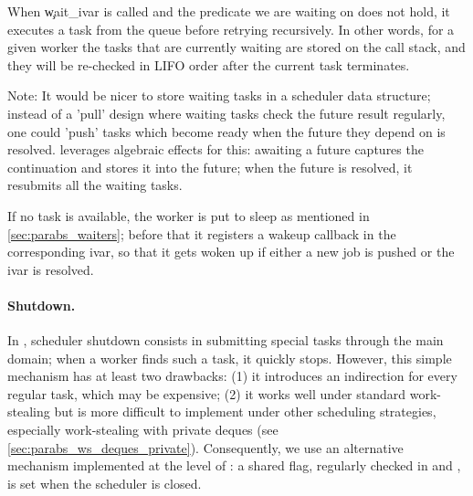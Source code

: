 When \c{wait\_ivar} is called and the predicate we are waiting on does not hold, it executes a task from the queue before retrying recursively. In other words, for a given worker the tasks that are currently waiting are stored on the call stack, and they will be re-checked in LIFO order after the current task terminates.

Note: It would be nicer to store waiting tasks in a scheduler data structure; instead of a 'pull' design where waiting tasks check the future result regularly, one could 'push' tasks which become ready when the future they depend on is resolved. \Domainslib leverages algebraic effects for this: awaiting a future captures the continuation and stores it into the future; when the future is resolved, it resubmits all the waiting tasks.

If no task is available, the worker is put to sleep as mentioned in \cref{sec:parabs_waiters}; before that it registers a wakeup callback in the corresponding ivar, so that it gets woken up if either a new job is pushed or the ivar is resolved.

\paragraph{Shutdown.}

In \Domainslib, scheduler shutdown consists in submitting special tasks through the main domain; when a worker finds such a task, it quickly stops.
However, this simple mechanism has at least two drawbacks:
(1) it introduces an indirection for every regular task, which may be expensive;
(2) it works well under standard work-stealing but is more difficult to implement under other scheduling strategies, especially work-stealing with private deques (see \cref{sec:parabs_ws_deques_private}).
Consequently, we use an alternative mechanism implemented at the level of : a shared flag, regularly checked in  and , is set when the scheduler is closed.
